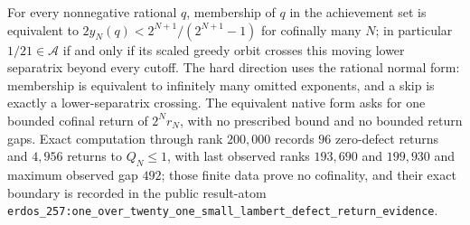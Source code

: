 \begin{thm}
For every nonnegative rational $q$, membership of $q$ in the achievement set
is equivalent to $2y_N(q)<2^{N+1}/(2^{N+1}-1)$ for cofinally many $N$; in
particular $1/21\in\mathcal A$ if and only if its scaled greedy orbit crosses
this moving lower separatrix beyond every cutoff.  The hard direction uses
the rational normal form: membership is equivalent to infinitely many omitted
exponents, and a skip is exactly a lower-separatrix crossing.  The equivalent
native form asks for one bounded cofinal return of $2^Nr_N$, with no
prescribed bound and no bounded return gaps.  Exact computation through rank
$200{,}000$ records $96$ zero-defect returns and $4{,}956$ returns to
$Q_N\le1$, with last observed ranks $193{,}690$ and $199{,}930$ and maximum
observed gap $492$; those finite data prove no cofinality, and their exact
boundary is recorded in the public result-atom
\texttt{erdos\_257:one\_over\_twenty\_one\_small\_lambert\_defect\_return\_evidence}.
\par\noindent{}  
\end{thm}


